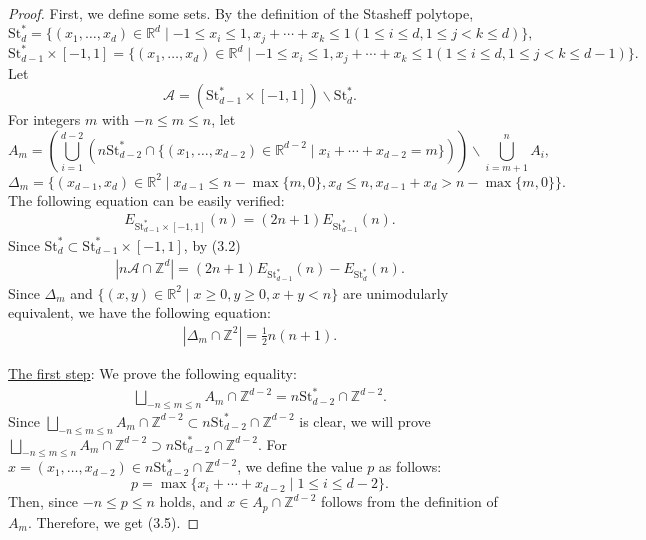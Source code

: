 \documentclass[a4paper,reqno,11pt, oneside]{amsart}
\newcommand{\Ac}{\mathcal{A}}
\newcommand{\ZZ}{\mathbb{Z}}
\newcommand{\RR}{\mathbb{R}}
\theoremstyle{definition}
\theoremstyle{remark}
\begin{document}
\begin{proof}
First, we define some sets. By the definition of the Stasheff polytope,
\[
\mathrm{St}_d^\ast = \{(x_1, \ldots, x_d) \in \RR^d \mid -1 \leq x_i \leq 1, x_j + \cdots + x_k \leq 1 (1 \leq i \leq d, 1 \leq j < k \leq d)\},
\]
\[
\mathrm{St}_{d-1}^\ast \times [-1, 1] = \{(x_1, \ldots, x_d) \in \RR^d \mid -1 \leq x_i \leq 1, x_j + \cdots + x_k \leq 1 (1 \leq i \leq d, 1 \leq j < k \leq d-1)\}.
\]
Let
$$\Ac = (\mathrm{St}_{d-1}^\ast \times [-1, 1]) \backslash \mathrm{St}_d^\ast.$$
For integers $m$ with $-n \leq m \leq n$, let
\[
A_m = \left(\bigcup_{i = 1}^{d - 2}(n\mathrm{St}_{d-2}^\ast \cap \{(x_1, \ldots, x_{d-2}) \in \RR^{d-2} \mid x_i + \cdots + x_{d-2} = m\})\right) \backslash \bigcup_{i = m+1}^{n}A_i,
\]
\[
\Delta_m = \{(x_{d-1}, x_d) \in \RR^2 \mid x_{d-1} \leq n-\max\{m, 0\}, x_d \leq n, x_{d-1} + x_d > n -\max\{m, 0\}\}.
\]
The following equation can be easily verified:
\begin{align}
  E_{\mathrm{St}_{d-1}^\ast \times [-1, 1]}(n) = (2n+1)E_{\mathrm{St}_{d-1}^\ast}(n).
\end{align}
Since $\mathrm{St}_d^\ast \subset \mathrm{St}_{d-1}^\ast \times [-1, 1]$, by (3.2)
\begin{align}
  \left|n\Ac \cap \ZZ^d\right| = (2n+1)E_{\mathrm{St}_{d-1}^\ast}(n) - E_{\mathrm{St}_d^\ast}(n).
\end{align}
Since $\Delta_m$ and $\{(x,y) \in \RR^2 \mid x \geq 0, y \geq 0, x+y < n\}$ are unimodularly equivalent, we have the following equation:
\begin{align}
  |\Delta_m \cap \ZZ^2| = \frac{1}{2}n(n+1).
\end{align}

\smallskip

\noindent
\underline{The first step}: We prove the following equality:
\begin{align}
  \bigsqcup_{-n \leq m \leq n}A_m \cap \ZZ^{d-2} = n\mathrm{St}_{d-2}^\ast \cap \ZZ^{d-2}.
\end{align}
Since $\bigsqcup_{-n \leq m \leq n}A_m \cap \ZZ^{d-2} \subset n\mathrm{St}_{d-2}^\ast \cap \ZZ^{d-2}$ is clear, we will prove $\bigsqcup_{-n \leq m \leq n}A_m \cap \ZZ^{d-2} \supset n\mathrm{St}_{d-2}^\ast \cap \ZZ^{d-2}$. For $x = (x_1, \ldots, x_{d-2}) \in n\mathrm{St}_{d-2}^\ast \cap \ZZ^{d-2}$, we define the value $p$ as follows:
$$p = \max{\{x_i + \cdots + x_{d-2} \mid 1 \leq i \leq d-2\}}.$$
Then, since $-n \leq p \leq n$ holds, and $x \in A_p \cap \ZZ^{d-2}$ follows from the definition of $A_m$. Therefore, we get (3.5).


\end{proof}
\end{document}
